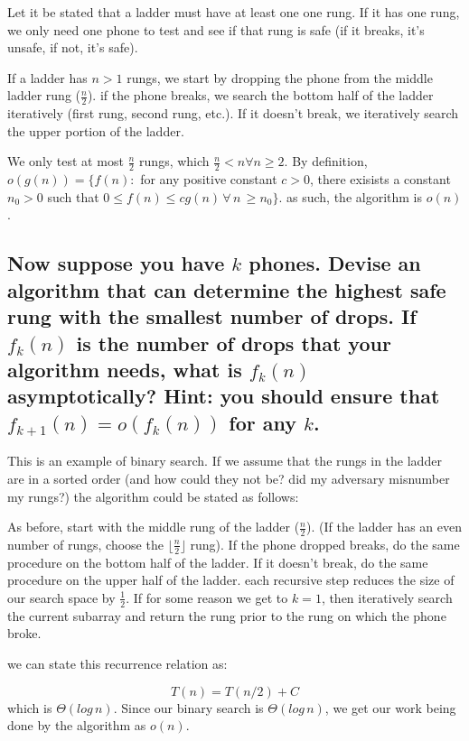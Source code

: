 \documentclass[titlepage]{article}\usepackage[]{graphicx}\usepackage[]{color}
\begin{document}
  Let it be stated that a ladder must have at least one one rung. If it has
  one rung, we only need one phone to test and see if that rung is safe (if it
  breaks, it's unsafe, if not, it's safe).

  If a ladder has $n > 1$ rungs, we start by dropping the phone from the middle
  ladder rung ($\frac{n}{2}$). if the phone breaks, we search the bottom half of the
  ladder iteratively (first rung, second rung, etc.). If it doesn't break, we
  iteratively search the upper portion of the ladder. 

  We only test at most $\frac{n}{2}$ rungs, which $\frac{n}{2} < n
  \forall n \geq 2$. 
  By definition, $o(g(n)) = \{ f(n) : $ for any positive constant $c>0$, there
  exisists a constant $n_0 > 0$ such that $0 \leq f(n) \leq cg(n) \, \forall \,
  n \, \geq n_0\}$.
  as such, the algorithm is $o(n)$. 

\subsection{Now suppose you have $k$ phones. Devise an algorithm that can
  determine the highest safe rung with the smallest number of drops. If
  $f_k(n)$
  is the number of drops that your algorithm needs, what is 
  $f_k(n)$ asymptotically? Hint: you should ensure that 
  $f_{k+1}(n) = o(f_k(n))$ for any $k$.}

  This is an example of binary search. If we assume that the rungs in the
  ladder are in a sorted order (and how could they not be? did my adversary
  misnumber my rungs?)  the algorithm could
  be stated as follows:

  As before, start with the middle rung of the ladder ($\frac{n}{2}$). (If the
  ladder has an even number of rungs, choose the $\lfloor
  \frac{n}{2} \rfloor$ rung). If the
  phone dropped breaks, do the same procedure on the bottom half of the ladder.
  If it doesn't break, do the same procedure on the upper half of the ladder.
  each recursive step reduces the size of our search space by $\frac{1}{2}$. If
  for some reason we get to $k=1$, then iteratively search the current subarray
  and return the rung prior to the rung on which the phone broke.

  we can state this recurrence relation as:

  \[ T(n) = T(n/2) + C \]
  which is $\Theta(log\,n)$. Since our binary search is $\Theta(log\,n)$, we
  get our work being done by the algorithm as $o(n)$. 
  
\end{document}
